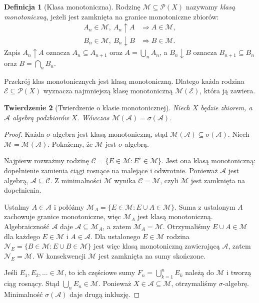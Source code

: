 \documentclass[11pt,a4paper,oneside]{book}
\numberwithin{equation}{chapter}
\theoremstyle{plain}
\newtheorem{twierdzenie}{Twierdzenie}[chapter]
\theoremstyle{definition}
\newtheorem{definicja}[twierdzenie]{Definicja}
\theoremstyle{remark}
\begin{document}
\begin{definicja}[Klasa monotoniczna]
\label{def:monotone-class}
Rodzinę $\mathcal M\subseteq\mathcal P(X)$ nazywamy \emph{klasą
monotoniczną}, jeżeli jest zamknięta na granice monotoniczne zbiorów:
\begin{align*}
A_n\in\mathcal M,\ A_n\uparrow A
&\Longrightarrow A\in\mathcal M,\\
B_n\in\mathcal M,\ B_n\downarrow B
&\Longrightarrow B\in\mathcal M.
\end{align*}
Zapis $A_n\uparrow A$ oznacza $A_n\subseteq A_{n+1}$ oraz
$A=\bigcup_nA_n$, a $B_n\downarrow B$ oznacza
$B_{n+1}\subseteq B_n$ oraz $B=\bigcap_nB_n$.
\end{definicja}

Przekrój klas monotonicznych jest klasą monotoniczną. Dlatego każda
rodzina $\mathcal E\subseteq\mathcal P(X)$ wyznacza najmniejszą klasę
monotoniczną $\mathcal M(\mathcal E)$, która ją zawiera.

\begin{twierdzenie}[Twierdzenie o klasie monotonicznej]
\label{thm:monotone-class}
Niech $X$ będzie zbiorem, a $\mathcal A$ algebrą podzbiorów $X$.
Wówczas $\mathcal M(\mathcal A)=\sigma(\mathcal A)$.
\end{twierdzenie}
\begin{proof}
Każda $\sigma$-algebra jest klasą monotoniczną, stąd
$\mathcal M(\mathcal A)\subseteq\sigma(\mathcal A)$.
Niech $\mathcal M=\mathcal M(\mathcal A)$. Pokażemy, że $\mathcal M$
jest $\sigma$-algebrą.

Najpierw rozważmy rodzinę
$\mathcal C=\{E\in\mathcal M:E^c\in\mathcal M\}$.
Jest ona klasą monotoniczną: dopełnienie zamienia ciągi rosnące
na malejące i odwrotnie. Ponieważ $\mathcal A$ jest algebrą,
$\mathcal A\subseteq\mathcal C$. Z minimalności $\mathcal M$
wynika $\mathcal C=\mathcal M$, czyli $\mathcal M$ jest zamknięta
na dopełnienia.

Ustalmy $A\in\mathcal A$ i połóżmy
$\mathcal M_A=\{E\in\mathcal M:E\cup A\in\mathcal M\}$.
Suma z ustalonym $A$ zachowuje granice monotoniczne, więc
$\mathcal M_A$ jest klasą monotoniczną. Algebraiczność $\mathcal A$
daje $\mathcal A\subseteq\mathcal M_A$, a zatem
$\mathcal M_A=\mathcal M$. Otrzymaliśmy
$E\cup A\in\mathcal M$ dla każdego $E\in\mathcal M$ i $A\in\mathcal A$.
Dla ustalonego $E\in\mathcal M$ rodzina
$\mathcal N_E=\{B\in\mathcal M:E\cup B\in\mathcal M\}$
jest więc klasą monotoniczną zawierającą $\mathcal A$, zatem
$\mathcal N_E=\mathcal M$. W konsekwencji $\mathcal M$ jest zamknięta
na sumy skończone.

Jeśli $E_1,E_2,\ldots\in\mathcal M$, to ich częściowe sumy
$F_n=\bigcup_{k=1}^nE_k$ należą do $\mathcal M$ i tworzą ciąg
rosnący. Stąd $\bigcup_nE_n\in\mathcal M$. Ponieważ
$X\in\mathcal A\subseteq\mathcal M$, otrzymaliśmy $\sigma$-algebrę.
Minimalność $\sigma(\mathcal A)$ daje drugą inkluzję.
\end{proof}
\end{document}
